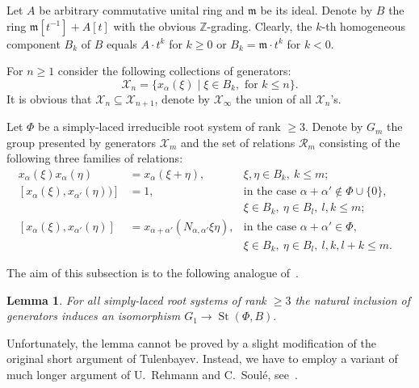\documentclass[oneside, 10pt]{amsart}
\DeclareMathOperator{\St}{St}
\newcommand{\XX}[1]{\mathcal{X}_{#1}}
\newcommand{\RR}[1]{\mathcal{R}_{#1}}
\newtheorem{lemma}{Lemma}
\theoremstyle{remark}
\begin{document}
   
Let $A$ be arbitrary commutative unital ring and $\mathfrak{m}$ be its ideal.
Denote by $B$ the ring $\mathfrak{m}[t^{-1}] + A[t]$ with the obvious $\mathbb{Z}$-grading.
Clearly, the $k$-th homogeneous component $B_k$ of $B$ equals $A\cdot t^k$ for $k \geq 0$ or $B_k = \mathfrak{m} \cdot t^k$ for $k<0$.

For $n \geq 1$ consider the following collections of generators:
\[\XX{n} = \{ x_\alpha(\xi) \mid \xi \in B_k,\text{ for } k\leq n\}. \]
It is obvious that $\XX{n} \subseteq \XX{n+1}$, denote by $\XX{\infty}$ the union of all $\XX{n}$'s.

Let $\Phi$ be a simply-laced irreducible root system of rank $\geq 3$.
Denote by $G_m$ the group presented by generators $\mathcal{X}_m$ and the set of relations $\RR{m}$ consisting of the following
 three families of relations:
\begin{align}
 \label{eq:am} \tag{$a_m$} x_\alpha(\xi) x_\alpha(\eta) & = x_\alpha(\xi+\eta),&  \xi,\eta\in B_k,\ k\leq m;&\\
 \label{eq:bm} \tag{$b_m$} [x_\alpha(\xi), x_{\alpha'}(\eta))] &  = 1, & \text{in the case $\alpha+\alpha'\not\in\Phi\cup\{0\}$,}\\
 \nonumber                                                     &       & \xi \in B_k,\ \eta \in B_l,\ l,k\leq m;\\
 \label{eq:cm} \tag{$c_m$} [x_\alpha(\xi), x_{\alpha'}(\eta)] & = x_{\alpha+\alpha'}(N_{\alpha,\alpha'}\xi\eta), & \text{in the case $\alpha+\alpha'\in \Phi$,}\\
 \nonumber                                                    &                                                  & \xi \in B_k,\ \eta \in B_l,\ l, k, l+k \leq m.
\end{align}

The aim of this subsection is to the following analogue of~\cite[Lemma~3.3]{Tu}. 
\begin{lemma}\label{lem:tul3.3}
 For all simply-laced root systems of rank $\geq 3$ the natural inclusion of generators induces an isomorphism $G_1 \to \St(\Phi, B).$
\end{lemma}
Unfortunately, the lemma cannot be proved by a slight modification of the original short argument of Tulenbayev.
Instead, we have to employ a variant of much longer argument of U.~Rehmann and C.~Soul{\'e}, see~\cite{R75,RS76}.
\end{document}
